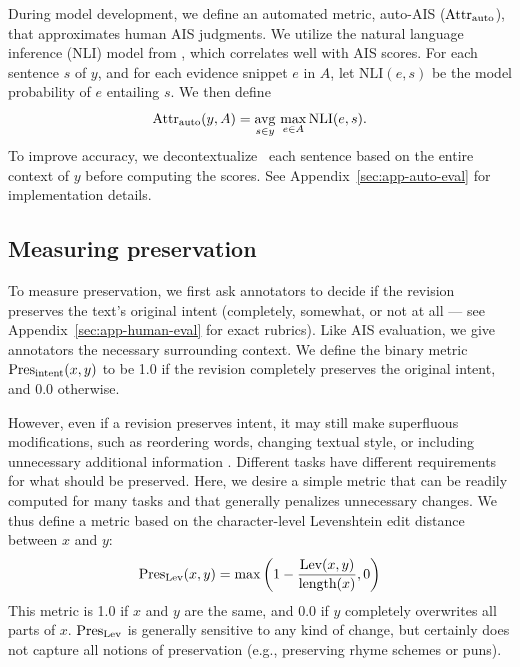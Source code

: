 During model development, we define
an automated metric, auto-AIS ($\text{Attr}_\text{auto}{}$), that approximates human AIS judgments.
We utilize the natural language inference (NLI) model from \citet{Honovich2022TRUERF}, which correlates well with AIS scores.
For each sentence $s$ of $y$,
and for each evidence snippet $e$ in $A$,
let $\text{NLI}(e, s)$ be the model probability of $e$ entailing $s$. We then define
\begin{equation}
\text{Attr}_\text{auto}(y, A) = \operatorname*{avg}_{s \in y} \, \max_{e \in A} \text{NLI}(e, s).
\end{equation}
To improve accuracy, we decontextualize~\cite{choi2021making} each sentence based on the entire context of $y$ %
before computing the scores.
See Appendix~\ref{sec:app-auto-eval} for implementation details.

\subsection{Measuring preservation}\label{sec:preservation}

To measure preservation, we first ask annotators to decide if the revision preserves the text's original intent (completely, somewhat, or not at all --- see Appendix~\ref{sec:app-human-eval} for exact rubrics).
Like AIS evaluation, we give annotators the necessary surrounding context.
We define the binary metric $\text{Pres}_\text{intent}(x, y)$ to be 1.0 if the revision completely preserves the original intent, and 0.0 otherwise.

However, even if a revision preserves intent, it may still make superfluous modifications, such as reordering words, changing textual style, or including unnecessary additional information \cite{thorne2021evidence}. Different tasks have different requirements for what should be preserved. Here, we desire a simple metric that can be readily computed for many tasks and that generally penalizes unnecessary changes.
We thus define a metric based on the character-level Levenshtein edit distance \cite{levenshtein1966binary} %
between $x$ and $y$:
\begin{equation}
\text{Pres}_\text{Lev}(x, y) = \max\left(1 - \frac{\text{{Lev}}(x, y)}{\text{{length}}(x)}, 0\right)
\end{equation}
This metric is 1.0 if $x$ and $y$ are the same, and 0.0 if $y$ completely overwrites all parts of $x$. $\text{Pres}_\text{Lev}$ is generally sensitive to any kind of change, but certainly does not capture all notions of preservation (e.g., preserving rhyme schemes or puns).

